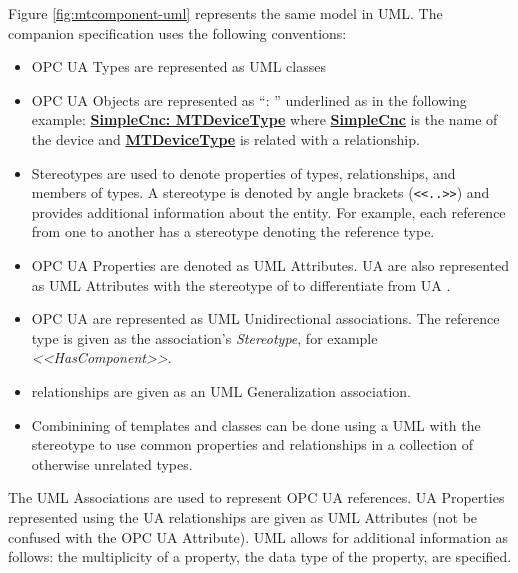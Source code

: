

Figure \ref{fig:mtcomponent-uml} represents the same model in UML. The companion specification uses the following conventions:

\begin{itemize}
\item OPC UA Types are represented as UML classes
\item OPC UA Objects are represented as ``: '' underlined as in the following example: \textbf{\underline{SimpleCnc: MTDeviceType}} where \textbf{\underline{SimpleCnc}} is the name of the device and  \textbf{\underline{MTDeviceType}} is related with a  relationship.
\item Stereotypes are used to denote properties of types, relationships, and members of types. A stereotype is denoted by angle brackets (\texttt{<<..>>}) and provides additional information about the entity. For example, each reference from one  to another has a stereotype denoting the reference type.
\item OPC UA Properties are denoted as UML Attributes. UA  are also represented as UML Attributes with the stereotype of  to differentiate from UA .
\item OPC UA   are represented as UML Unidirectional associations. The reference type is given as the association's \textit{Stereotype}, for example \textit{<<HasComponent>>}. 
\item {} relationships are given as an UML Generalization association.
\item Combinining of templates and classes can be done using a UML  with the stereotype  to use common properties and relationships in a collection of otherwise unrelated types.
\end{itemize}

The UML Associations are used to represent OPC UA references. UA Properties represented using the UA  relationships are given as UML Attributes (not be confused with the OPC UA Attribute). UML allows for additional information as follows:  the multiplicity of a property, the data type of the property, are specified.


\FloatBarrier

